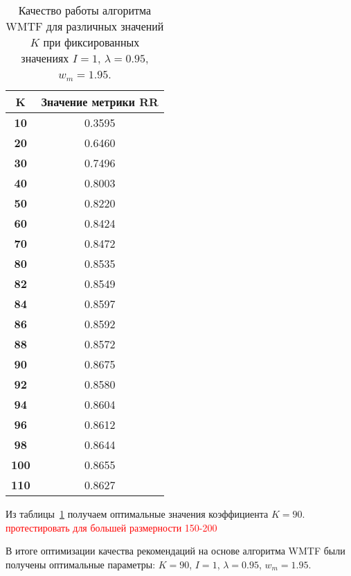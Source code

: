     \begin{table}[ht!]
        \caption{Качество работы алгоритма WMTF для различных значений $K$ при фиксированных значениях $I=1$, $\lambda=0.95$, $w_m=1.95$. \bigskip}
        \centering

        \label{tabular:wtmf_test4}
        \begin{tabular}{|c|c|} \hline
            \bf{K}  & \bf{Значение метрики RR} \\ \hline
            \bf{10} & 0.3595 \\ \hline
            \bf{20} & 0.6460 \\ \hline
            \bf{30} & 0.7496 \\ \hline
            \bf{40} & 0.8003 \\ \hline
            \bf{50} & 0.8220 \\ \hline
            \bf{60} & 0.8424 \\ \hline
            \bf{70} & 0.8472 \\ \hline
            \bf{80} & 0.8535 \\ \hline
            \bf{82} & 0.8549 \\ \hline
            \bf{84} & 0.8597 \\ \hline
            \bf{86} & 0.8592 \\ \hline
            \bf{88} & 0.8572 \\ \hline
            \bf{90} & 0.8675 \\ \hline
            \bf{92} & 0.8580 \\ \hline
            \bf{94} & 0.8604 \\ \hline
            \bf{96} & 0.8612 \\ \hline
            \bf{98} & 0.8644 \\ \hline
            \bf{100} & 0.8655 \\ \hline
            \bf{110} & 0.8627 \\ \hline
        \end{tabular}
    \end{table}
    Из таблицы~\ref{tabular:wtmf_test4} получаем оптимальные значения коэффициента $K=90$. \textcolor{red}{протестировать для большей размерности 150-200}

    В итоге оптимизации качества рекомендаций на основе алгоритма WMTF были получены оптимальные параметры:
    $K=90$, $I=1$, $\lambda=0.95$, $w_m=1.95$.

    \clearpage